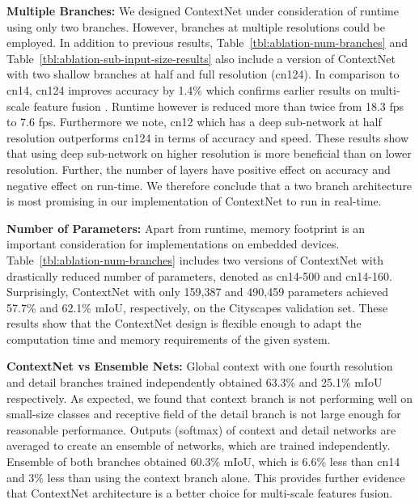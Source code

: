 \documentclass[runningheads]{llncs}
\newcommand{\subsubsubsection}[1]{\vspace{0.2em}\noindent\textbf{\textcolor[rgb]{0,.1,.4}{#1:}}}
\begin{document}
\subsubsubsection{Multiple Branches} We designed ContextNet under consideration of runtime using only two branches. However, branches at multiple resolutions could be employed. In addition to previous results, Table~\ref{tbl:ablation-num-branches} and Table~\ref{tbl:ablation-sub-input-size-results} also include a version of ContextNet with two shallow branches at half and full resolution (cn124). In comparison to cn14, cn124 improves accuracy by 1.4\% which confirms earlier results on multi-scale feature fusion \cite{lin2017,ghiasi2016,zhao2017b}. Runtime however is reduced more than twice from 18.3 fps to 7.6 fps. Furthermore we note, cn12 which has a deep sub-network at half resolution outperforms cn124 in terms of accuracy and speed. These results show that using deep sub-network on higher resolution is more beneficial than on lower resolution. Further, the number of layers have positive effect on accuracy and negative effect on run-time. We therefore conclude that a two branch architecture is most promising in our implementation of ContextNet to run in real-time.

\subsubsubsection{Number of Parameters} Apart from runtime, memory footprint is an important consideration for implementations on embedded devices. Table~\ref{tbl:ablation-num-branches} includes two versions of ContextNet with drastically reduced number of parameters, denoted as cn14-500 and cn14-160. Surprisingly, ContextNet with only 159,387 and 490,459 parameters achieved 57.7\% and 62.1\% mIoU, respectively, on the Cityscapes validation set. These results show that the ContextNet design is flexible enough to adapt the computation time and memory requirements of the given system.

\subsubsubsection{ContextNet vs Ensemble Nets}
Global context with one fourth resolution and detail branches trained independently obtained 63.3\% and 25.1\% mIoU respectively. As expected, we found that context branch is not performing well on small-size classes and receptive field of the detail branch is not large enough for reasonable performance. Outputs (softmax) of context and detail networks are averaged to create an ensemble of networks, which are trained independently. Ensemble of both branches obtained 60.3\% mIoU, which is 6.6\% less than cn14 and 3\% less than using the context branch alone. This provides further evidence that ContextNet architecture is a better choice for multi-scale features fusion.
\end{document}
